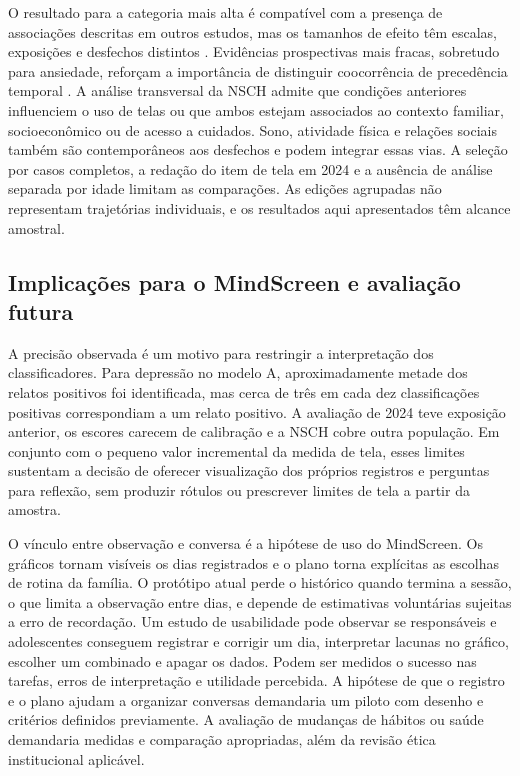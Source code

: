 ﻿\documentclass[12pt]{article}
\begin{document}
O resultado para a categoria mais alta é compatível com a presença de associações descritas em outros estudos, mas os tamanhos de efeito têm escalas, exposições e desfechos distintos \cite{boers2019,gao2024,paulich2021}. Evidências prospectivas mais fracas, sobretudo para ansiedade, reforçam a importância de distinguir coocorrência de precedência temporal \cite{tang2021,li2025}. A análise transversal da NSCH admite que condições anteriores influenciem o uso de telas ou que ambos estejam associados ao contexto familiar, socioeconômico ou de acesso a cuidados. Sono, atividade física e relações sociais também são contemporâneos aos desfechos e podem integrar essas vias. A seleção por casos completos, a redação do item de tela em 2024 e a ausência de análise separada por idade limitam as comparações. As edições agrupadas não representam trajetórias individuais, e os resultados aqui apresentados têm alcance amostral.

\subsection{Implicações para o MindScreen e avaliação futura}
A precisão observada é um motivo para restringir a interpretação dos classificadores. Para depressão no modelo A, aproximadamente metade dos relatos positivos foi identificada, mas cerca de três em cada dez classificações positivas correspondiam a um relato positivo. A avaliação de 2024 teve exposição anterior, os escores carecem de calibração e a NSCH cobre outra população. Em conjunto com o pequeno valor incremental da medida de tela, esses limites sustentam a decisão de oferecer visualização dos próprios registros e perguntas para reflexão, sem produzir rótulos ou prescrever limites de tela a partir da amostra.

O vínculo entre observação e conversa é a hipótese de uso do MindScreen. Os gráficos tornam visíveis os dias registrados e o plano torna explícitas as escolhas de rotina da família. O protótipo atual perde o histórico quando termina a sessão, o que limita a observação entre dias, e depende de estimativas voluntárias sujeitas a erro de recordação. Um estudo de usabilidade pode observar se responsáveis e adolescentes conseguem registrar e corrigir um dia, interpretar lacunas no gráfico, escolher um combinado e apagar os dados. Podem ser medidos o sucesso nas tarefas, erros de interpretação e utilidade percebida. A hipótese de que o registro e o plano ajudam a organizar conversas demandaria um piloto com desenho e critérios definidos previamente. A avaliação de mudanças de hábitos ou saúde demandaria medidas e comparação apropriadas, além da revisão ética institucional aplicável.
\end{document}
